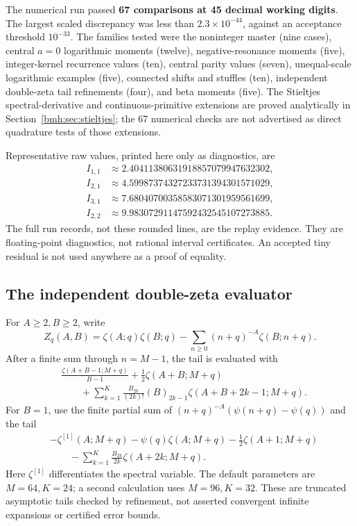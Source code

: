The numerical run passed \textbf{67 comparisons at 45 decimal working
digits}. The largest scaled discrepancy was less than
$2.3\times10^{-44}$, against an acceptance threshold $10^{-33}$.
The families tested were the noninteger master (nine cases), central
$a=0$ logarithmic moments (twelve), negative-resonance moments (five),
integer-kernel recurrence values (ten), central parity values (seven),
unequal-scale logarithmic examples (five), connected shifts and stuffles
(ten), independent double-zeta tail refinements (four), and beta moments
(five). The Stieltjes spectral-derivative and continuous-primitive
extensions are proved analytically in Section~\ref{bmh:sec:stieltjes};
the 67 numerical checks are not advertised as direct quadrature tests
of those extensions.

Representative raw values, printed here only as diagnostics, are
\begin{align*}
 I_{1,1}&\approx2.40411380631918857079947632302,\\
 I_{2,1}&\approx4.59987374327233731394301571029,\\
 I_{3,1}&\approx7.68040700358583071301959561699,\\
 I_{2,2}&\approx9.98307291147592432545107273885.
\end{align*}
The full run records, not these rounded lines, are the replay evidence.
They are floating-point diagnostics, not rational interval certificates.
An accepted tiny residual is not used anywhere as a proof of equality.

\subsection{The independent double-zeta evaluator}
For $A\ge2,B\ge2$, write
\[
 Z_q(A,B)=\zeta(A;q)\zeta(B;q)
       -\sum_{n\ge0}(n+q)^{-A}\zeta(B;n+q).
\]
After a finite sum through $n=M-1$, the tail is evaluated with
\begin{align*}
 &\frac{\zeta(A+B-1;M+q)}{B-1}
 +\frac12\zeta(A+B;M+q)\\
 &\qquad+\sum_{k=1}^{K}\frac{B_{2k}}{(2k)!}(B)_{2k-1}
          \zeta(A+B+2k-1;M+q).
\end{align*}
For $B=1$, use the finite partial sum of
$(n+q)^{-A}(\psi(n+q)-\psi(q))$ and the tail
\begin{align*}
 &-\zeta^{[1]}(A;M+q)-\psi(q)\zeta(A;M+q)
   -\frac12\zeta(A+1;M+q)\\
 &\qquad-\sum_{k=1}^{K}\frac{B_{2k}}{2k}
                      \zeta(A+2k;M+q).
\end{align*}
Here $\zeta^{[1]}$ differentiates the spectral variable. The default
parameters are $M=64,K=24$; a second calculation uses $M=96,K=32$.
These are truncated asymptotic tails checked by refinement, not asserted
convergent infinite expansions or certified error bounds.

